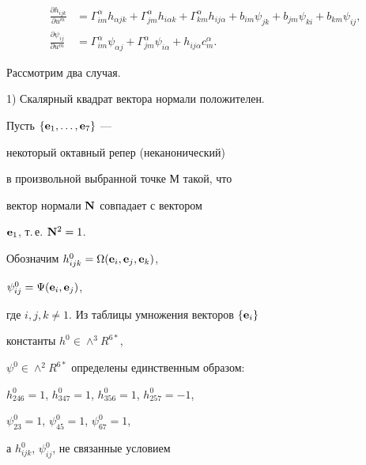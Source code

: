 \begin{equation}


\begin{split}


{\frac{\partial h_{ijk}}{\partial u^m}}&=


\Gamma^{\alpha }_{im}h_{\alpha jk}+\Gamma^{\alpha


}_{jm}h_{i\alpha k}+


\Gamma^{\alpha }_{km}h_{ij\alpha }+


b_{im}\psi _{jk}+b_{jm}\psi_{ki}+b_{km}\psi_{ij},\\


%


{\frac{\partial \psi_{ij}}{\partial u^m}}&=


\Gamma^{\alpha }_{im}\psi_{\alpha j}+


\Gamma^{\alpha }_{jm}\psi_{i\alpha }+h_{ij\alpha


}c_{m}^{\alpha }.


\end{split}


\end{equation}


Рассмотрим два случая.


1) Скалярный квадрат вектора нормали положителен.


Пусть $ \{ \bold{e}_1,\dotsc, \bold{e}_7\} $ ---


некоторый октавный репер (неканонический)


в произвольной выбранной точке М такой, что


вектор нормали $\bold{N}$ совпадает с вектором


$\bold{e}_1$, т.\,е. $\bold{N}^2=1$.





Обозначим $h^0_{ijk}=\Omega (\bold{e}_i,\bold{e}_j, \bold{e}_k)$,


$\psi ^0_{ij}=\Psi (\bold{e}_i, \bold{e}_j)$,


где $i,j,k\neq 1$. Из таблицы умножения векторов $\{\bold{e}_i\}$


константы $h^0\in \wedge ^3 R^{6*}$,


$\psi ^0\in \wedge ^2 R^{6*}$ определены единственным образом:


$h^0_{246}=1$, $h^0_{347}=1$, $h^0_{356}=1$, $h^0_{257}=-1$,


$\psi ^0_{23}=1$, $\psi ^0_{45}=1$, $\psi ^0_{67}=1$,


а $h^0_{ijk}$, $\psi ^0_{ij}$, не связанные условием


